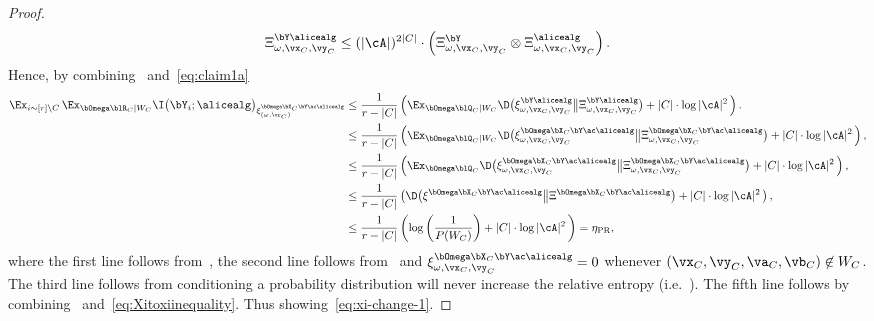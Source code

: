 \begin{proof}
	\begin{equation*}
		\Xi^{\bY  \alicealg}_{\omega, \vx_C, \vy_C} \leq (|\cA|)^{2|C|} \cdot \left(\Xi_{\omega , \vx_C, \vy_C}^{\bY} \otimes \Xi^{\alicealg}_{\omega, \vx_C, \vy_C}\right).
	\end{equation*}
	Hence, by combining~ and~\eqref{eq:claim1a}
	\begin{align*}
			\Ex_{i \sim [r] \setminus C} \,  \Ex_{\bOmega \blR_C| W_C} \I \big (\bY_i ; \alicealg \big )_{\xi^{\bOmega \bX_C \bY \ac \alicealg}_{(\omega, \vr_C)}}	&\leq \frac{1}{r-|C|} \left(  \Ex_{\bOmega \blQ_C| W_C} \D \big (\xi_{\omega, \vx_C, \vy_C}^{\bY  \alicealg} \big \| \Xi_{\omega, \vx_C, \vy_C}^{  \bY  \alicealg} \big) +  |C| \cdot \log{|\cA|^2} \, \right).\notag\\
			&\leq \frac{1}{r-|C|} \left( \Ex_{\bOmega \blQ_C| W_C} \D \big (\xi_{\omega, \vx_C, \vy_C}^{\bOmega \bX_C \bY \ac \alicealg} \big \| \Xi_{\omega, \vx_C, \vy_C}^{\bOmega \bX_C \bY \ac \alicealg} \big) +  |C| \cdot \log{|\cA|^2} \, \right),\notag\\
				&\leq \frac{1}{r-|C|} \left( \Ex_{\bOmega \blQ_C} \D \big (\xi_{\omega, \vx_C, \vy_C}^{\bOmega \bX_C \bY \ac \alicealg} \big \| \Xi_{\omega, \vx_C, \vy_C}^{\bOmega \bX_C \bY \ac \alicealg} \big) +  |C| \cdot \log{|\cA|^2} \, \right),\notag\\
			&\leq \frac{1}{r-|C|} \left( \D \big (\xi^{\bOmega \bX_C \bY \ac \alicealg} \big \| \Xi^{\bOmega \bX_C \bY \ac \alicealg} \big) +  |C| \cdot \log{|\cA|^2} \, \right),\notag\\
			&\leq \frac{1}{r-|C|} \left( \log\left(\frac{1}{P(W_C)}\right) +  |C| \cdot \log{|\cA|^2} \, \right) = \eta_{\text{PR}},\notag\\
	\end{align*}
	where the first line follows from~, the second line follows from~ and $\xi_{\omega, \vx_C, \vy_C}^{\bOmega \bX_C \bY \ac \alicealg} = 0$ whenever $(\vx_C, \vy_C, \va_C, \vb_C) \not\in W_C$. The third line follows from conditioning a probability distribution will never increase the relative entropy (i.e.~). The fifth line follows by combining~ and~\eqref{eq:Xitoxiinequality}. Thus showing~\eqref{eq:xi-change-1}.

\end{proof}
